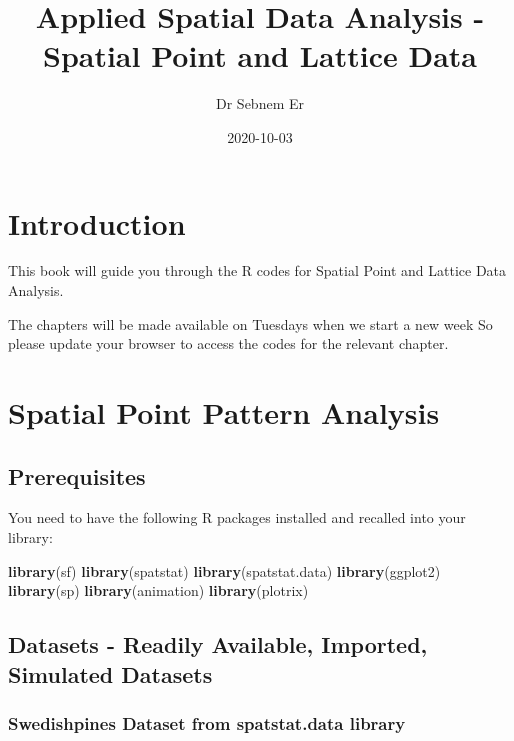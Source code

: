 \documentclass[
]{book}
\title{Applied Spatial Data Analysis - Spatial Point and Lattice Data}
\author{Dr Sebnem Er}
\date{2020-10-03}
\newenvironment{Shaded}{\begin{snugshade}}{\end{snugshade}}
\newcommand{\KeywordTok}[1]{\textcolor[rgb]{0.13,0.29,0.53}{\textbf{#1}}}
\newcommand{\NormalTok}[1]{#1}
\begin{document}
\maketitle

{
\setcounter{tocdepth}{1}
\tableofcontents
}
\hypertarget{introduction}{%
\chapter{Introduction}\label{introduction}}

This book will guide you through the R codes for Spatial Point and Lattice Data Analysis.

The chapters will be made available on Tuesdays when we start a new week So please update your browser to access the codes for the relevant chapter.

\hypertarget{spatial-point-pattern-analysis}{%
\chapter{Spatial Point Pattern Analysis}\label{spatial-point-pattern-analysis}}

\hypertarget{prerequisites}{%
\section{Prerequisites}\label{prerequisites}}

You need to have the following R packages installed and recalled into your library:

\begin{Shaded}
\begin{Highlighting}[]
\KeywordTok{library}\NormalTok{(sf)}
\KeywordTok{library}\NormalTok{(spatstat)}
\KeywordTok{library}\NormalTok{(spatstat.data)}
\KeywordTok{library}\NormalTok{(ggplot2)}
\KeywordTok{library}\NormalTok{(sp)}
\KeywordTok{library}\NormalTok{(animation)}
\KeywordTok{library}\NormalTok{(plotrix)}
\end{Highlighting}
\end{Shaded}

\hypertarget{datasets---readily-available-imported-simulated-datasets}{%
\section{Datasets - Readily Available, Imported, Simulated Datasets}\label{datasets---readily-available-imported-simulated-datasets}}

\hypertarget{swedishpines-dataset-from-spatstat.data-library}{%
\subsection{Swedishpines Dataset from spatstat.data library}\label{swedishpines-dataset-from-spatstat.data-library}}
\end{document}
